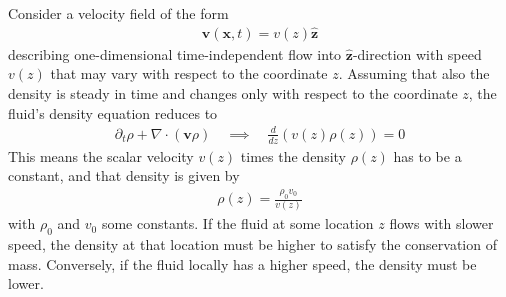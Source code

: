 \begin{example}
    Consider a velocity field of the form
    \begin{align*}
        \bm{v}(\bm{x},t)=v(z)\bm{\hat{z}}
    \end{align*}
    describing one-dimensional time-independent flow into $\bm{\hat{z}}$-direction with speed $v(z)$ that may vary with respect to the coordinate $z$. Assuming that also the density is steady in time and changes only with respect to the coordinate $z$, the fluid's density equation reduces to
    \begin{align*}
        \partial_t\rho+\nabla\cdot(\bm{v}\rho) \quad \implies \quad \frac{d}{dz}(v(z)\rho(z))=0
    \end{align*}
    This means the scalar velocity $v(z)$ times the density $\rho(z)$ has to be a constant, and that density is given by
    \begin{align*}
        \rho(z)=\frac{\rho_0v_0}{v(z)}
    \end{align*}
    with $\rho_0$ and $v_0$ some constants. If the fluid at some location $z$ flows with slower speed, the density at that location must be higher to satisfy the conservation of mass. Conversely, if the fluid locally has a higher speed, the density must be lower.
\end{example}

